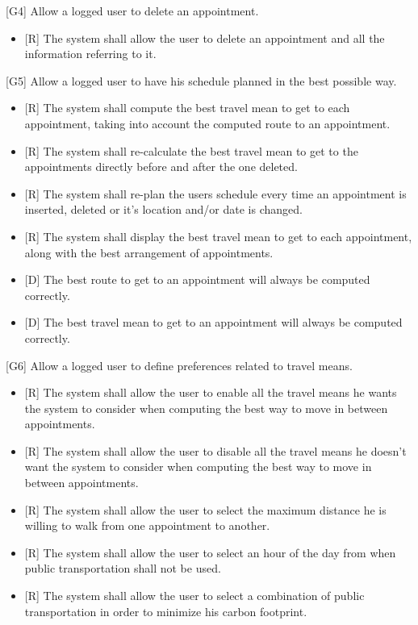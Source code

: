 \documentclass[12pt]{article}
\begin{document}
{[G4]} Allow a logged user to delete an appointment.
\begin{itemize}
    \item{[R]} The system shall allow the user to delete an appointment and all the information referring to it.
\end{itemize}
{[G5]} Allow a logged user to have his schedule planned in the best possible way.
\begin{itemize}
    \item{[R]} The system shall compute the best travel mean to get to each appointment, taking into account the computed route to an appointment.
    \item{[R]} The system shall re-calculate the best travel mean to get to the appointments directly before and after the one deleted.
    \item{[R]} The system shall re-plan the users schedule every time an appointment is inserted, deleted or it's location and/or date is changed.
    \item{[R]} The system shall display the best travel mean to get to each appointment, along with the best arrangement of appointments.
    \item{[D]} The best route to get to an appointment will always be computed correctly.
    \item{[D]} The best travel mean to get to an appointment will always be computed correctly.
    
\end{itemize}
{[G6]} Allow a logged user to define preferences related to travel means.
\begin{itemize}
    \item{[R]} The system shall allow the user to enable all the travel means he wants the system to consider when computing the best way to move in between appointments.
    \item{[R]} The system shall allow the user to disable all the travel means he doesn't want the system to consider when computing the best way to move in between appointments.
    \item{[R]} The system shall allow the user to select the maximum distance he is willing to walk from one appointment to another.
    \item{[R]} The system shall allow the user to select an hour of the day from when public transportation shall not be used.
    \item{[R]} The system shall allow the user to select a combination of public transportation in order to minimize his carbon footprint.
\end{itemize}
\end{document}
